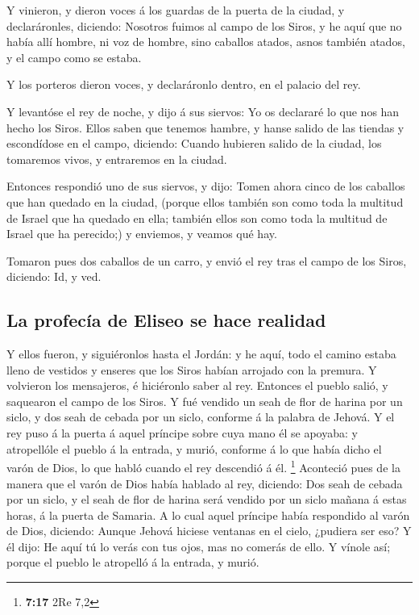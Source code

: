  Y vinieron, y dieron voces á los guardas de la puerta de
la ciudad, y declaráronles, diciendo: Nosotros fuimos al campo de los
Siros, y he aquí que no había allí hombre, ni voz de hombre, sino
caballos atados, asnos también atados, y el campo como se estaba.

 Y los porteros dieron voces, y declaráronlo dentro, en
el palacio del rey.

 Y levantóse el rey de noche, y dijo á sus siervos: Yo os
declararé lo que nos han hecho los Siros. Ellos saben que tenemos
hambre, y hanse salido de las tiendas y escondídose en el campo,
diciendo: Cuando hubieren salido de la ciudad, los tomaremos vivos, y
entraremos en la ciudad.

 Entonces respondió uno de sus siervos, y dijo: Tomen
ahora cinco de los caballos que han quedado en la ciudad, (porque ellos
también son como toda la multitud de Israel que ha quedado en ella;
también ellos son como toda la multitud de Israel que ha perecido;) y
enviemos, y veamos qué hay.

 Tomaron pues dos caballos de un carro, y envió el rey
tras el campo de los Siros, diciendo: Id, y ved.

\hypertarget{la-profecuxeda-de-eliseo-se-hace-realidad}{%
\subsection{La profecía de Eliseo se hace
realidad}\label{la-profecuxeda-de-eliseo-se-hace-realidad}}

 Y ellos fueron, y siguiéronlos hasta el Jordán: y he
aquí, todo el camino estaba lleno de vestidos y enseres que los Siros
habían arrojado con la premura. Y volvieron los mensajeros, é hiciéronlo
saber al rey.  Entonces el pueblo salió, y saquearon el
campo de los Siros. Y fué vendido un seah de flor de harina por un
siclo, y dos seah de cebada por un siclo, conforme á la palabra de
Jehová.  Y el rey puso á la puerta á aquel príncipe sobre
cuya mano él se apoyaba: y atropellóle el pueblo á la entrada, y murió,
conforme á lo que había dicho el varón de Dios, lo que habló cuando el
rey descendió á él. \footnote{\textbf{7:17} 2Re 7,2} 
Aconteció pues de la manera que el varón de Dios había hablado al rey,
diciendo: Dos seah de cebada por un siclo, y el seah de flor de harina
será vendido por un siclo mañana á estas horas, á la puerta de Samaria.
 A lo cual aquel príncipe había respondido al varón de
Dios, diciendo: Aunque Jehová hiciese ventanas en el cielo, ¿pudiera ser
eso? Y él dijo: He aquí tú lo verás con tus ojos, mas no comerás de
ello.  Y vínole así; porque el pueblo le atropelló á la
entrada, y murió.

